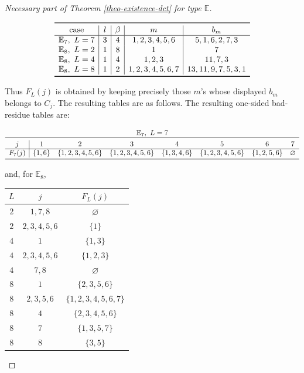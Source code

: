 \documentclass[12pt]{article}
\theoremstyle{plain}
\theoremstyle{definition}
\begin{document}
\begin{proof}[Necessary part of Theorem \ref{theo-existence-dct} for type $\mathbb{E}$]
\begin{center}
\[
		\begin{array}{c|c|c|c|c}
	\toprule
	\text{case}&l&\beta&m&b_m\\
	\hline
	\mathbb E_7,\ L=7&3&4&1,2,3,4,5,6&5,1,6,2,7,3\\
	\mathbb E_8,\ L=2&1&8&1&7\\
	\mathbb E_8,\ L=4&1&4&1,2,3&11,7,3\\
	\mathbb E_8,\ L=8&1&2&1,2,3,4,5,6,7&13,11,9,7,5,3,1\\
	\bottomrule
		\end{array}
		\]
\label{tab:exceptional-bm}
\end{center}
Thus \(F_L(j)\) is obtained by keeping precisely those \(m\)'s whose displayed \(b_m\) belongs to \(C_j\).  The resulting tables are as follows. 
The resulting one-sided bad-residue tables are:
\begin{center}
	\[
	\begin{array}{c|ccccccc}
	\multicolumn{8}{c}{\mathbb E_7,\ L=7}\\
    \toprule
		j&1&2&3&4&5&6&7\\
		\hline
		F_7(j)&
		\{1,6\}&\{1,2,3,4,5,6\}&\{1,2,3,4,5,6\}&
		\{1,3,4,6\}&\{1,2,3,4,5,6\}&\{1,2,5,6\}&\varnothing\\
		\bottomrule
	\end{array}
	\]
\label{tab:E7-F7}
\end{center}
	and, for \(\mathbb E_8\),
	\begin{center}
	\small
	\begin{tabular}{c|c|c}
	\toprule
	\(L\)&\(j\)&\(F_L(j)\)\\
	\midrule
		\(2\)&\(1,7,8\)&\(\varnothing\)\\
		\(2\)&\(2,3,4,5,6\)&\(\{1\}\)\\
		\midrule
		\(4\)&\(1\)&\(\{1,3\}\)\\
		\(4\)&\(2,3,4,5,6\)&\(\{1,2,3\}\)\\
		\(4\)&\(7,8\)&\(\varnothing\)\\
		\midrule
		\(8\)&\(1\)&\(\{2,3,5,6\}\)\\
		\(8\)&\(2,3,5,6\)&\(\{1,2,3,4,5,6,7\}\)\\
		\(8\)&\(4\)&\(\{2,3,4,5,6\}\)\\
		\(8\)&\(7\)&\(\{1,3,5,7\}\)\\
		\(8\)&\(8\)&\(\{3,5\}\)\\
	\bottomrule
	\end{tabular}
\vspace{0.5em}

\end{center}
\end{proof}
\end{document}
